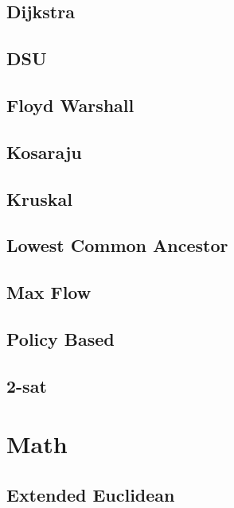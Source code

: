 \subsection{Dijkstra}
\raggedbottom
\hrulefill
\subsection{DSU}
\raggedbottom
\hrulefill
\subsection{Floyd Warshall}
\raggedbottom
\hrulefill
\subsection{Kosaraju}
\raggedbottom
\hrulefill
\subsection{Kruskal}
\raggedbottom
\hrulefill
\subsection{Lowest Common Ancestor}
\raggedbottom
\hrulefill
\subsection{Max Flow}
\raggedbottom
\hrulefill
\subsection{Policy Based}
\raggedbottom
\hrulefill
\subsection{2-sat}
\raggedbottom
\hrulefill

\section{Math}
\subsection{Extended Euclidean}
\raggedbottom
\hrulefill
